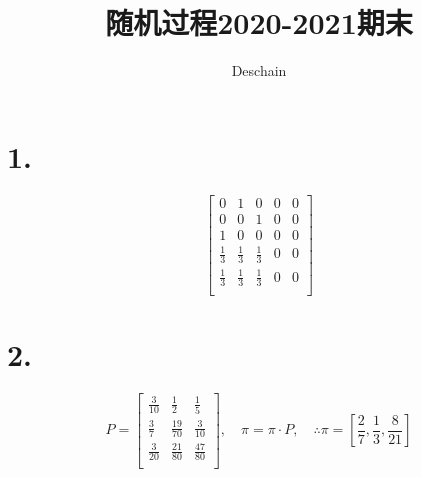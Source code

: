 \documentclass[UTF8]{ctexart}
\title{随机过程2020-2021期末}
\author{Deschain}
\begin{document}
\maketitle
\section*{1.}
\begin{equation*}
  \begin{bmatrix}
    0           & 1           & 0           & 0 & 0 \\
    0           & 0           & 1           & 0 & 0 \\
    1           & 0           & 0           & 0 & 0 \\
    \frac{1}{3} & \frac{1}{3} & \frac{1}{3} & 0 & 0 \\
    \frac{1}{3} & \frac{1}{3} & \frac{1}{3} & 0 & 0 \\
  \end{bmatrix}
\end{equation*}
\section*{2.}
\begin{equation*}
  P=\begin{bmatrix}
    \frac{3}{10} & \frac{1}{2}   & \frac{1}{5}   \\
    \frac{3}{7}  & \frac{19}{70} & \frac{3}{10}  \\
    \frac{3}{20} & \frac{21}{80} & \frac{47}{80} \\
  \end{bmatrix},\quad
  \pi=\pi\cdot P,\quad\therefore\pi=[\frac{2}{7},\frac{1}{3},\frac{8}{21}]
\end{equation*}
\end{document}
